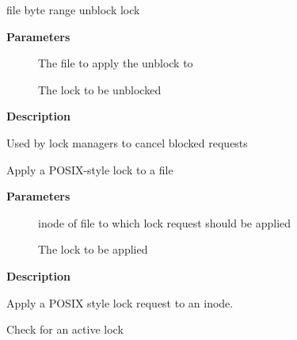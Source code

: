 \documentclass[a4paper,8pt,english]{sphinxmanual}
\begin{document}
\begin{fulllineitems}
\label{filesystems/index:c.vfs_cancel_lock}
file byte range unblock lock

\end{fulllineitems}


\textbf{Parameters}
\begin{description}
\item[{}] \leavevmode
The file to apply the unblock to

\item[{}] \leavevmode
The lock to be unblocked

\end{description}

\textbf{Description}

Used by lock managers to cancel blocked requests

\begin{fulllineitems}
\label{filesystems/index:c.posix_lock_inode_wait}
Apply a POSIX-style lock to a file

\end{fulllineitems}


\textbf{Parameters}
\begin{description}
\item[{}] \leavevmode
inode of file to which lock request should be applied

\item[{}] \leavevmode
The lock to be applied

\end{description}

\textbf{Description}

Apply a POSIX style lock request to an inode.

\begin{fulllineitems}
\label{filesystems/index:c.locks_mandatory_locked}
Check for an active lock

\end{fulllineitems}
\end{document}
